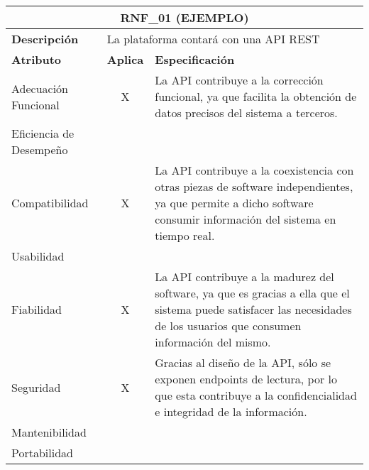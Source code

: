 \begin{center}
  \begin{tabular}{ | p{2cm}| p{8cm} | p{5cm} |}
    \hline
    \multicolumn{3}{|c|}{\textbf{RNF\_01 (EJEMPLO)}} \\
    \hline
    
    \multicolumn{1}{|p{2cm}|}{\textbf{Descripción}} & \multicolumn{2}{|p{13cm}|}{La plataforma contará con una API REST} \\ \hline
    
    \multicolumn{1}{|p{3.5cm}|}{\textbf{{Atributo}}} & \multicolumn{1}{|p{1.5cm}|}{\textbf{Aplica}} & \multicolumn{1}{|p{10cm}|}{\textbf{Especificación}} \\ \hline
    
    \multicolumn{1}{|p{3.5cm}|}{\nohyphens{Adecuación Funcional}} & \multicolumn{1}{|c|}{X} & \multicolumn{1}{|p{10cm}|}{La API contribuye a la corrección funcional, ya que facilita la obtención de datos precisos del sistema a terceros.} \\ \hline
    
    \multicolumn{1}{|p{3.5cm}|}{\nohyphens{Eficiencia de Desempeño}} & \multicolumn{1}{|c|}{} & \multicolumn{1}{|p{10cm}|}{} \\ \hline
    
    \multicolumn{1}{|p{3.5cm}|}{\nohyphens{Compatibilidad}} & \multicolumn{1}{|c|}{X} & \multicolumn{1}{|p{10cm}|}{La API contribuye a la coexistencia con otras piezas de software independientes, ya que permite a dicho software consumir información del sistema en tiempo real.} \\ \hline
    
    \multicolumn{1}{|p{3.5cm}|}{\nohyphens{Usabilidad}} & \multicolumn{1}{|c|}{} & \multicolumn{1}{|p{10cm}|}{} \\ \hline
    
    \multicolumn{1}{|p{3.5cm}|}{\nohyphens{Fiabilidad}} & \multicolumn{1}{|c|}{X} & \multicolumn{1}{|p{10cm}|}{La API contribuye a la madurez del software, ya que es gracias a ella que el sistema puede satisfacer las necesidades de los usuarios que consumen información del mismo.} \\ \hline
    
    \multicolumn{1}{|p{3.5cm}|}{\nohyphens{Seguridad}} & \multicolumn{1}{|c|}{X} & \multicolumn{1}{|p{10cm}|}{Gracias al diseño de la API, sólo se exponen endpoints de lectura, por lo que esta contribuye a la confidencialidad e integridad de la información.} \\ \hline
    
    \multicolumn{1}{|p{3.5cm}|}{\nohyphens{Mantenibilidad}} & \multicolumn{1}{|c|}{} & \multicolumn{1}{|p{10cm}|}{} \\ \hline
    
    \multicolumn{1}{|p{3.5cm}|}{\nohyphens{Portabilidad}} & \multicolumn{1}{|c|}{} & \multicolumn{1}{|p{10cm}|}{} \\

    \hline
  \end{tabular}

  \label{table:rnf:api}
\end{center}

